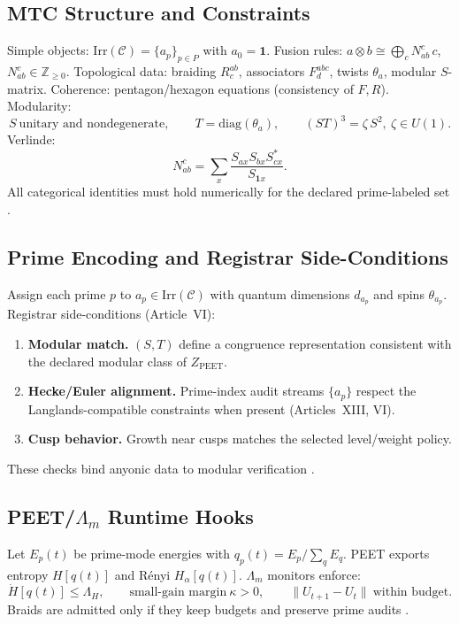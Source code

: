 \documentclass[12pt]{amsart}
\theoremstyle{plain}
\begin{document}
\subsection{MTC Structure and Constraints}
Simple objects: $\mathrm{Irr}(\mathcal{C})=\{a_p\}_{p\in P}$ with $a_0=\mathbf{1}$.
Fusion rules: $a\otimes b \cong \bigoplus_{c} N_{ab}^{c}\,c$, $N_{ab}^{c}\in\mathbb{Z}_{\ge 0}$.
Topological data: braiding $R^{ab}_c$, associators $F^{abc}_d$, twists $\theta_a$, modular $S$-matrix.
Coherence: pentagon/hexagon equations (consistency of $F,R$).
Modularity:
\[
S\ \text{unitary and nondegenerate},\qquad T=\mathrm{diag}(\theta_a),\qquad (ST)^3 = \zeta\, S^2,\ \zeta\in U(1).
\]
Verlinde:
\[
N_{ab}^{c}=\sum_{x}\frac{S_{ax}S_{bx}S_{cx}^\ast}{S_{\mathbf{1}x}}.
\]
All categorical identities must hold numerically for the declared prime-labeled set \cite{etingof2015tensor,nayak2008nonabelian}.

\subsection{Prime Encoding and Registrar Side-Conditions}
Assign each prime $p$ to $a_p\in\mathrm{Irr}(\mathcal{C})$ with quantum dimensions $d_{a_p}$ and spins $\theta_{a_p}$.
Registrar side-conditions (Article~VI):
\begin{enumerate}
  \item \textbf{Modular match.} $(S,T)$ define a congruence representation consistent with the declared modular class of $Z_{\mathrm{PEET}}$.
  \item \textbf{Hecke/Euler alignment.} Prime-index audit streams $\{a_p\}$ respect the Langlands-compatible constraints when present (Articles~XIII, VI).
  \item \textbf{Cusp behavior.} Growth near cusps matches the selected level/weight policy.
\end{enumerate}
These checks bind anyonic data to modular verification \cite{freedman2003topological,nayak2008nonabelian,etingof2015tensor}.

\subsection{PEET/\texorpdfstring{$\Lambda_m$}{Lambda-m} Runtime Hooks}
Let $E_p(t)$ be prime-mode energies with $q_p(t)=E_p/\sum_q E_q$.
PEET exports entropy $H[q(t)]$ and Rényi $H_\alpha[q(t)]$.
$\Lambda_m$ monitors enforce:
\[
\dot H[q(t)]\le \Lambda_H,\qquad \text{small-gain margin}\ \kappa>0,\qquad \|U_{t+1}-U_t\|\ \text{within budget}.
\]
Braids are admitted only if they keep budgets and preserve prime audits \cite{kitaev2003fault,nayak2008nonabelian,pachos2012introduction}.
\end{document}
